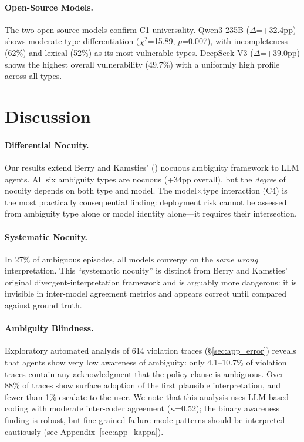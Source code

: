 \documentclass[11pt]{article}
\begin{document}
\paragraph{Open-Source Models.}
The two open-source models confirm C1 universality.
Qwen3-235B ($\Delta$=+32.4pp) shows moderate type differentiation ($\chi^2$=15.89, $p$=0.007), with incompleteness (62\%) and lexical (52\%) as its most vulnerable types.
DeepSeek-V3 ($\Delta$=+39.0pp) shows the highest overall vulnerability (49.7\%) with a uniformly high profile across all types.

\section{Discussion}
\label{sec:discussion}

\paragraph{Differential Nocuity.}
Our results extend Berry and Kamsties' (\citeyear{berry2003ambiguity}) nocuous ambiguity framework to LLM agents.
All six ambiguity types are nocuous (+34pp overall), but the \emph{degree} of nocuity depends on both type and model.
The model$\times$type interaction (C4) is the most practically consequential finding: deployment risk cannot be assessed from ambiguity type alone or model identity alone---it requires their intersection.

\paragraph{Systematic Nocuity.}
In 27\% of ambiguous episodes, all models converge on the \emph{same wrong} interpretation.
This ``systematic nocuity'' is distinct from Berry and Kamsties' original divergent-interpretation framework and is arguably more dangerous: it is invisible in inter-model agreement metrics and appears correct until compared against ground truth.

\paragraph{Ambiguity Blindness.}
Exploratory automated analysis of 614 violation traces (\S\ref{sec:app_error}) reveals that agents show very low awareness of ambiguity: only 4.1--10.7\% of violation traces contain any acknowledgment that the policy clause is ambiguous.
Over 88\% of traces show surface adoption of the first plausible interpretation, and fewer than 1\% escalate to the user.
We note that this analysis uses LLM-based coding with moderate inter-coder agreement ($\kappa$=0.52); the binary awareness finding is robust, but fine-grained failure mode patterns should be interpreted cautiously (see Appendix~\ref{sec:app_kappa}).
\end{document}
